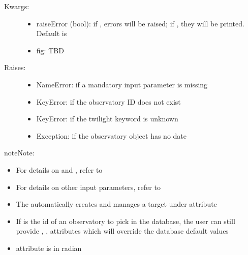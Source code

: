 \documentclass[letterpaper,10pt,english]{sphinxmanual}
\begin{document}
\begin{fulllineitems}
\begin{description}
\begin{itemize}
\end{itemize}

\item[{Kwargs:}] \leavevmode\begin{itemize}
\item {} 
raiseError (bool): if , errors will be raised; if , they will be printed. Default is 

\item {} 
fig: TBD

\end{itemize}

\item[{Raises:}] \leavevmode\begin{itemize}
\item {} 
NameError: if a mandatory input parameter is missing

\item {} 
KeyError: if the observatory ID does not exist

\item {} 
KeyError: if the twilight keyword is unknown

\item {} 
Exception: if the observatory object has no date

\end{itemize}

\end{description}

\begin{notice}{note}{Note:}\begin{itemize}
\item {} 
For details on  and , refer to 

\item {} 
For details on other input parameters, refer to 

\item {} 
The  automatically creates and manages a  target under  attribute

\item {} 
If  is the id of an observatory to pick in the database, the user can still provide , ,  attributes which will override the database default values

\item {} 
 attribute is in radian


\end{itemize}
\end{notice}
\end{fulllineitems}
\end{document}
